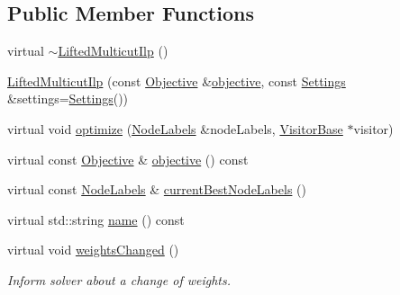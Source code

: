 \subsection*{Public Member Functions}
\begin{DoxyCompactItemize}
\item 
virtual \hyperlink{classnifty_1_1graph_1_1lifted__multicut_1_1LiftedMulticutIlp_abd3f0f67ab66073f5cecfe8724ab56e4}{$\sim$\+Lifted\+Multicut\+Ilp} ()
\item 
\hyperlink{classnifty_1_1graph_1_1lifted__multicut_1_1LiftedMulticutIlp_afea9d91a8f9d6570bf773cf6a2724307}{Lifted\+Multicut\+Ilp} (const \hyperlink{classnifty_1_1graph_1_1lifted__multicut_1_1LiftedMulticutIlp_a9e7a118481038bcb5b4f1a41edd05b39}{Objective} \&\hyperlink{classnifty_1_1graph_1_1lifted__multicut_1_1LiftedMulticutIlp_ae87c418362b292d18094e1b69af68f0a}{objective}, const \hyperlink{structnifty_1_1graph_1_1lifted__multicut_1_1LiftedMulticutIlp_1_1Settings}{Settings} \&settings=\hyperlink{structnifty_1_1graph_1_1lifted__multicut_1_1LiftedMulticutIlp_1_1Settings}{Settings}())
\item 
virtual void \hyperlink{classnifty_1_1graph_1_1lifted__multicut_1_1LiftedMulticutIlp_aaa8693e03ff6fb0f863c449410374329}{optimize} (\hyperlink{classnifty_1_1graph_1_1lifted__multicut_1_1LiftedMulticutIlp_ab9a112af2057c917ee8f86723df0fe19}{Node\+Labels} \&node\+Labels, \hyperlink{classnifty_1_1graph_1_1lifted__multicut_1_1LiftedMulticutIlp_a1bc9b2e1c6bd45ec6d201a8150935edc}{Visitor\+Base} $\ast$visitor)
\item 
virtual const \hyperlink{classnifty_1_1graph_1_1lifted__multicut_1_1LiftedMulticutIlp_a9e7a118481038bcb5b4f1a41edd05b39}{Objective} \& \hyperlink{classnifty_1_1graph_1_1lifted__multicut_1_1LiftedMulticutIlp_ae87c418362b292d18094e1b69af68f0a}{objective} () const 
\item 
virtual const \hyperlink{classnifty_1_1graph_1_1lifted__multicut_1_1LiftedMulticutIlp_ab9a112af2057c917ee8f86723df0fe19}{Node\+Labels} \& \hyperlink{classnifty_1_1graph_1_1lifted__multicut_1_1LiftedMulticutIlp_a9786ce36240b3c7b47f25e7de676af84}{current\+Best\+Node\+Labels} ()
\item 
virtual std\+::string \hyperlink{classnifty_1_1graph_1_1lifted__multicut_1_1LiftedMulticutIlp_a7324f336c92085c7d87c4f3f601302b6}{name} () const 
\item 
virtual void \hyperlink{classnifty_1_1graph_1_1lifted__multicut_1_1LiftedMulticutIlp_a3c1d526c0615ed8b1375044b1e30f4c1}{weights\+Changed} ()
\begin{DoxyCompactList}\small\item\em Inform solver about a change of weights. \end{DoxyCompactList}\end{DoxyCompactItemize}


